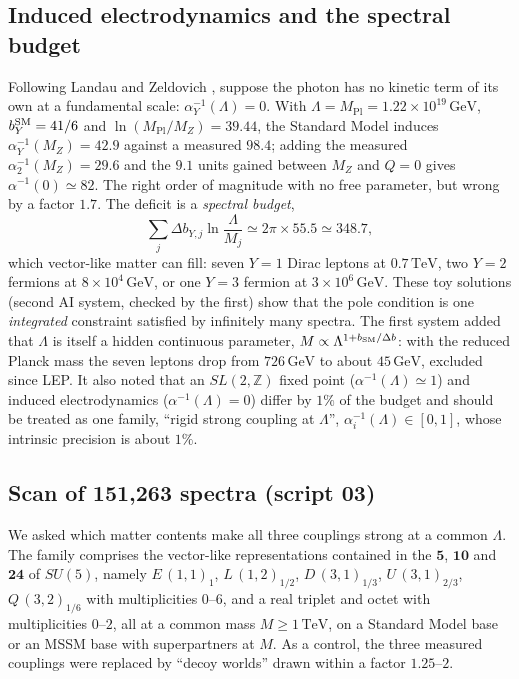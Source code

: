 \documentclass[11pt,a4paper]{article}
\newcommand{\ainv}{\alpha^{-1}}
\newcommand{\GeV}{\,\mathrm{GeV}}
\newcommand{\TeV}{\,\mathrm{TeV}}
\newcommand{\MPl}{M_{\mathrm{Pl}}}
\begin{document}
\subsection{Induced electrodynamics and the spectral budget}
Following Landau and Zeldovich \cite{Landau,Zeldovich}, suppose the photon has no kinetic term of its own at a fundamental
scale: $\ainv_Y(\Lambda)=0$. With $\Lambda=\MPl=1.22\times10^{19}\GeV$, $b_Y^{\rm SM}=41/6$ and $\ln(\MPl/M_Z)=39.44$, the
Standard Model induces $\ainv_Y(M_Z)=42.9$ against a measured $98.4$; adding the measured $\ainv_2(M_Z)=29.6$ and the
$9.1$ units gained between $M_Z$ and $Q=0$ gives $\ainv(0)\simeq82$. The right order of magnitude with no free parameter,
but wrong by a factor $1.7$. The deficit is a \emph{spectral budget},
\begin{equation}\label{eq:budget}
\sum_j\Delta b_{Y,j}\ln\frac{\Lambda}{M_j}\simeq2\pi\times55.5\simeq348.7 ,
\end{equation}
which vector-like matter can fill: seven $Y{=}1$ Dirac leptons at $0.7\TeV$, two $Y{=}2$ fermions at $8\times10^4\GeV$, or
one $Y{=}3$ fermion at $3\times10^6\GeV$. These toy solutions (second AI system, checked by the first) show that the
pole condition is one \emph{integrated} constraint satisfied by infinitely many spectra. The first system added that
$\Lambda$ is itself a hidden continuous parameter, $M\propto\Lambda^{1+b_{\rm SM}/\Delta b}$: with the reduced Planck mass the
seven leptons drop from $726\GeV$ to about $45\GeV$, excluded since LEP. It also noted that an $SL(2,\mathbb Z)$
fixed point ($\ainv(\Lambda)\simeq1$) and induced electrodynamics ($\ainv(\Lambda)=0$) differ by $1\%$ of the budget and should
be treated as one family, ``rigid strong coupling at $\Lambda$'', $\ainv_i(\Lambda)\in[0,1]$, whose intrinsic precision
is about $1\%$.

\subsection{Scan of 151{,}263 spectra (script 03)}
We asked which matter contents make all three couplings strong at a common $\Lambda$. The family comprises the vector-like
representations contained in the $\mathbf5$, $\mathbf{10}$ and $\mathbf{24}$ of $SU(5)$, namely $E\,(1,1)_1$, $L\,(1,2)_{1/2}$,
$D\,(3,1)_{1/3}$, $U\,(3,1)_{2/3}$, $Q\,(3,2)_{1/6}$ with multiplicities $0$--$6$, and a real triplet and octet with
multiplicities $0$--$2$, all at a common mass $M\ge1\TeV$, on a Standard Model base or an MSSM base with superpartners
at $M$. As a control, the three measured couplings were replaced by ``decoy worlds'' drawn within a factor $1.25$--$2$.
\end{document}
